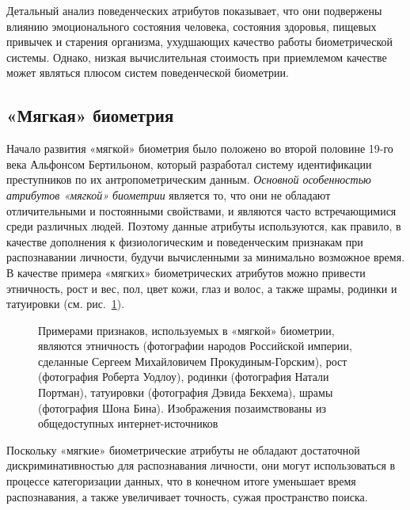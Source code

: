 \documentclass[12pt]{book}
\begin{document}
{Детальный анализ поведенческих атрибутов показывает, что они подвержены влиянию эмоционального состояния человека, состояния здоровья, пищевых привычек и старения организма, ухудшающих качество работы биометрической системы. Однако, низкая вычислительная стоимость при приемлемом качестве может являться плюсом систем поведенческой биометрии.

}

\subsection{«Мягкая» биометрия}

\large{Начало развития «мягкой» биометрия \cite{unar_2014} было положено во второй половине 19-го века Альфонсом Бертильоном, который разработал систему идентификации преступников по их антропометрическим данным. \textit{Основной особенностью атрибутов «мягкой» биометрии} является то, что они не обладают отличительными и постоянными свойствами, и являются часто встречающимися среди различных людей. Поэтому данные атрибуты используются, как правило, в качестве дополнения к физиологическим и поведенческим признакам при распознавании личности, будучи вычисленными за минимально возможное время. В качестве примера «мягких» биометрических атрибутов можно привести этничность, рост и вес, пол, цвет кожи, глаз и волос, а также шрамы, родинки и татуировки (см. рис.~\ref{fig:figure_1_6}).}

\begin{figure}[]
\caption{Примерами признаков, используемых в «мягкой» биометрии, являются этничность (фотографии народов Российской империи, сделанные Сергеем Михайловичем Прокудиным-Горским), рост (фотография Роберта Уодлоу), родинки (фотография Натали Портман), татуировки (фотография Дэвида Бекхема), шрамы (фотография Шона Бина). Изображения позаимствованы из общедоступных интернет-источников}
\label{fig:figure_1_6}
\end{figure}

\large{Поскольку «мягкие» биометрические атрибуты не обладают достаточной дискриминативностью для распознавания личности, они могут использоваться в процессе категоризации данных, что в конечном итоге уменьшает время распознавания, а также увеличивает точность, сужая пространство поиска.}
\end{document}

